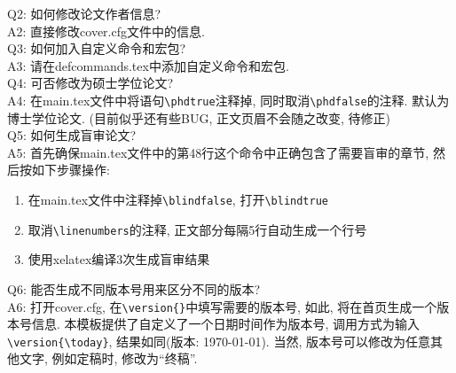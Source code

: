 Q2: 如何修改论文作者信息?\\
A2: 直接修改cover.cfg文件中的信息.\\

Q3: 如何加入自定义命令和宏包?\\
A3: 请在defcommands.tex中添加自定义命令和宏包.\\

Q4: 可否修改为硕士学位论文?\\
A4: 在main.tex文件中将语句\verb|\phdtrue|注释掉, 同时取消\verb|\phdfalse|的注释. 默认为博士学位论文. (目前似乎还有些BUG, 正文页眉不会随之改变, 待修正)\\

Q5: 如何生成盲审论文?\\
A5: 首先确保main.tex文件中的第48行这个\verb||命令中正确包含了需要盲审的章节, 然后按如下步骤操作:
\begin{enumerate}
\item 在main.tex文件中注释掉\verb|\blindfalse|, 打开\verb|\blindtrue|
\item 取消\verb|\linenumbers|的注释, 正文部分每隔5行自动生成一个行号
\item 使用xelatex编译3次生成盲审结果
\end{enumerate}

Q6: 能否生成不同版本号用来区分不同的版本?\\
A6: 打开cover.cfg, 在\verb|\version{}|中填写需要的版本号, 如此, 将在首页生成一个版本号信息. 本模板提供了自定义了一个日期时间作为版本号, 调用方式为输入\verb|\version{\today}|, 结果如同(版本: \today). 当然, 版本号可以修改为任意其他文字, 例如定稿时, 修改为``终稿''.
